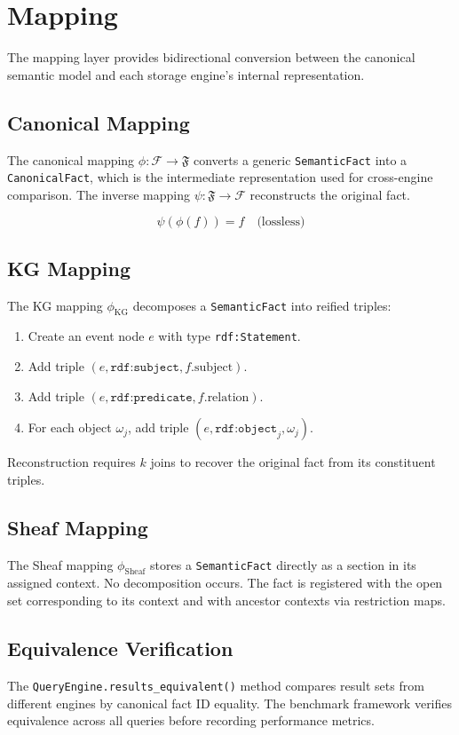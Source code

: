 \section{Mapping}
\label{sec:mapping}

The mapping layer provides bidirectional conversion between the canonical
semantic model and each storage engine's internal representation.

\subsection{Canonical Mapping}
\label{sec:mapping:canonical}

The canonical mapping $\phi: \mathcal{F} \to \mathfrak{F}$ converts a
generic \texttt{SemanticFact} into a \texttt{CanonicalFact}, which is the
intermediate representation used for cross-engine comparison. The inverse
mapping $\psi: \mathfrak{F} \to \mathcal{F}$ reconstructs the original fact.

\[
\psi(\phi(f)) = f \quad \text{(lossless)}
\]

\subsection{KG Mapping}
\label{sec:mapping:kg}

The KG mapping $\phi_{\mathrm{KG}}$ decomposes a \texttt{SemanticFact}
into reified triples:

\begin{enumerate}
    \item Create an event node $e$ with type \texttt{rdf:Statement}.
    \item Add triple $(e, \texttt{rdf:subject}, f.\text{subject})$.
    \item Add triple $(e, \texttt{rdf:predicate}, f.\text{relation})$.
    \item For each object $\omega_j$, add triple
          $(e, \texttt{rdf:object}_j, \omega_j)$.
\end{enumerate}

Reconstruction requires $k$ joins to recover the original fact from
its constituent triples.

\subsection{Sheaf Mapping}
\label{sec:mapping:sheaf}

The Sheaf mapping $\phi_{\mathrm{Sheaf}}$ stores a \texttt{SemanticFact}
directly as a section in its assigned context. No decomposition occurs.
The fact is registered with the open set corresponding to its context and
with ancestor contexts via restriction maps.

\subsection{Equivalence Verification}
\label{sec:mapping:verification}

The \texttt{QueryEngine.results\_equivalent()} method compares result sets
from different engines by canonical fact ID equality. The benchmark
framework verifies equivalence across all queries before recording
performance metrics.
